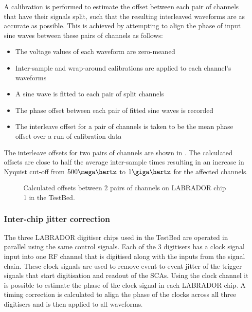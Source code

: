 A calibration is performed to estimate the offset between each pair of channels that have their signals split, such that the resulting interleaved waveforms are as accurate as possible. This is achieved by attempting to align the phase of input sine waves between these pairs of channels as follows:

\begin{itemize}
\item The voltage values of each waveform are zero-meaned
\item Inter-sample and wrap-around calibrations are applied to each channel's waveforms
\item A sine wave is fitted to each pair of split channels
\item The phase offset between each pair of fitted sine waves is recorded
\item The interleave offset for a pair of channels is taken to be the mean phase offset over a run of calibration data
\end{itemize}

The interleave offsets for two pairs of channels are shown in . The calculated offsets are close to half the average inter-sample times resulting in an increase in Nyquist cut-off from $500 \mega\hertz$ to $1\giga\hertz$ for the affected channels.

\begin{figure}[htpb]
  \hfill
  \caption{Calculated offsets between 2 pairs of channels on LABRADOR chip 1 in the TestBed.}
  \label{fig:calibration:LABRADOR-Digitiser-Chip:Interleave}
\end{figure}



\subsubsection{Inter-chip jitter correction}
\label{sec:calibration:LABRADOR-Digitiser-Chip:Inter-chip-jitter-correction}

The three LABRADOR digitiser chips used in the TestBed are operated in parallel using the same control signals. Each of the 3 digitisers has a clock signal input into one RF channel that is digitised along with the inputs from the signal chain. These clock signals are used to remove event-to-event jitter of the trigger signals that start digitisation and readout of the SCAs. Using the clock channel it is possible to estimate the phase of the clock signal in each LABRADOR chip. A timing correction is calculated to align the phase of the clocks across all three digitisers and is then applied to all waveforms.

